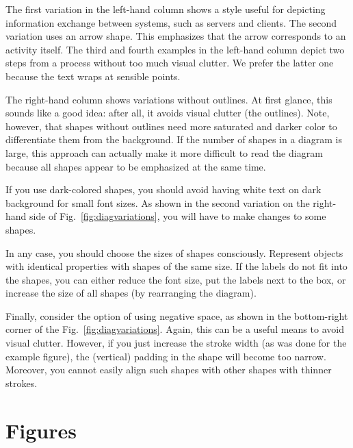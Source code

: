 The first variation in the left-hand column shows a style useful for depicting information exchange between systems, such as servers and clients. The second variation uses an arrow shape. This emphasizes that the arrow corresponds to an activity itself. The third and fourth examples in the left-hand column depict two steps from a process without too much visual clutter. We prefer the latter one because the text wraps at sensible points.

The right-hand column shows variations without outlines. At first glance, this sounds like a good  idea: after all, it avoids visual clutter (the outlines). Note, however, that shapes without outlines need more saturated and darker color to differentiate them from the background.  If the number of shapes in a diagram is large, this approach can actually make it more difficult to read the diagram because all shapes appear to be emphasized at the same time.

If you use dark-colored shapes, you should avoid having white text on dark background for small font sizes. As shown in the second variation on the right-hand side of Fig.~\ref{fig:diagvariations}, you will have to make changes to some shapes.

In any case, you should choose the sizes of shapes consciously. Represent objects with identical properties with shapes of the same size. If the labels do not fit into the shapes, you can either reduce the font size, put the labels next to the box, or increase the size of all shapes (by rearranging the diagram).

Finally, consider the option of using negative space, as shown in the bottom-right corner of the Fig.~\ref{fig:diagvariations}. Again, this can be a useful means to avoid visual clutter. However, if you just increase the stroke width (as was done for the example figure), the (vertical) padding in the shape will become too narrow. Moreover, you cannot easily align such shapes with other shapes with thinner strokes.

\section{Figures}

















